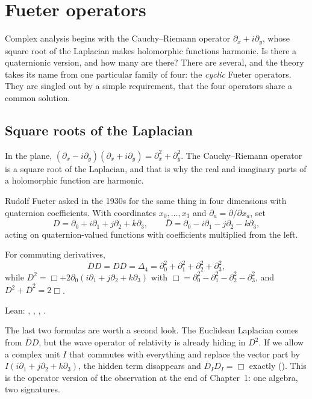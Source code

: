 \chapter{Fueter operators}\label{ch:fueter}

\begin{questionbox}
Complex analysis begins with the Cauchy--Riemann operator $\partial_x+i\partial_y$, whose square root of the Laplacian makes holomorphic functions harmonic. Is there a quaternionic version, and how many are there? There are several, and the theory takes its name from one particular family of four: the \emph{cyclic} Fueter operators. They are singled out by a simple requirement, that the four operators share a common solution.
\end{questionbox}

\section{Square roots of the Laplacian}

In the plane, $(\partial_x-i\partial_y)(\partial_x+i\partial_y)=\partial_x^2+\partial_y^2$. The Cauchy--Riemann operator is a square root of the Laplacian, and that is why the real and imaginary parts of a holomorphic function are harmonic.

Rudolf Fueter asked in the 1930s for the same thing in four dimensions with quaternion coefficients. With coordinates $x_0,\dots,x_3$ and $\partial_a=\partial/\partial x_a$, set
\[
D=\partial_0+i\partial_1+j\partial_2+k\partial_3,\qquad \bar D=\partial_0-i\partial_1-j\partial_2-k\partial_3 ,
\]
acting on quaternion-valued functions with coefficients multiplied from the left.

\begin{theorem}\proved\label{thm:fueterlap}
For commuting derivatives,
\[
\bar DD=D\bar D=\Delta_4=\partial_0^2+\partial_1^2+\partial_2^2+\partial_3^2 ,
\]
while $D^2=\Box+2\partial_0(i\partial_1+j\partial_2+k\partial_3)$ with $\Box=\partial_0^2-\partial_1^2-\partial_2^2-\partial_3^2$, and $D^2+\bar D^2=2\Box$.
\end{theorem}
\noindent Lean: , , , .

The last two formulas are worth a second look. The Euclidean Laplacian comes from $\bar DD$, but the wave operator of relativity is already hiding in $D^2$. If we allow a complex unit $I$ that commutes with everything and replace the vector part by $I(i\partial_1+j\partial_2+k\partial_3)$, the hidden term disappears and $\bar D_ID_I=\Box$ exactly (). This is the operator version of the observation at the end of Chapter~1: one algebra, two signatures.


